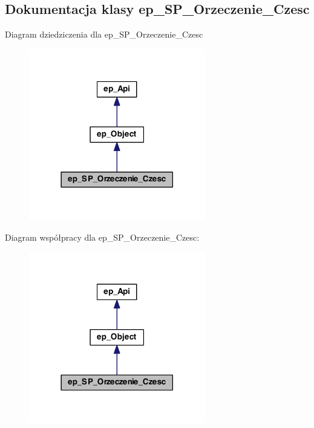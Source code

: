 \hypertarget{classep___s_p___orzeczenie___czesc}{\subsection{Dokumentacja klasy ep\-\_\-\-S\-P\-\_\-\-Orzeczenie\-\_\-\-Czesc}
\label{classep___s_p___orzeczenie___czesc}
}


Diagram dziedziczenia dla ep\-\_\-\-S\-P\-\_\-\-Orzeczenie\-\_\-\-Czesc\nopagebreak
\begin{figure}[H]
\begin{center}
\leavevmode
\includegraphics[width=218pt]{classep___s_p___orzeczenie___czesc__inherit__graph}
\end{center}
\end{figure}


Diagram współpracy dla ep\-\_\-\-S\-P\-\_\-\-Orzeczenie\-\_\-\-Czesc\-:\nopagebreak
\begin{figure}[H]
\begin{center}
\leavevmode
\includegraphics[width=218pt]{classep___s_p___orzeczenie___czesc__coll__graph}
\end{center}
\end{figure}
